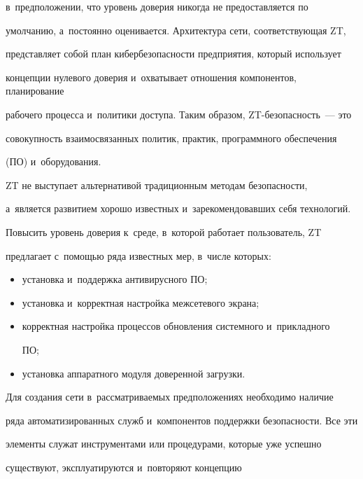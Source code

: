 {в~предположении, что уровень доверия никогда не предоставляется по 


умолчанию, а~постоянно оценивается. Архитектура сети, соответствующая ZT, 


представляет собой план кибербезопасности предприятия, который использует 


концепции нулевого доверия и~охватывает отношения компонентов, планирование 


рабочего процесса и~политики доступа. Таким образом, ZT-безопас\-ность~--- это 


совокупность взаимосвязанных политик, практик, программного обеспечения 


(ПО) и~оборудования.


  


  ZT не выступает альтернативой традиционным методам безопасности, 


а~является развитием хорошо известных и~зарекомендовавших себя технологий. 


Повысить уровень доверия к~среде, в~которой работает пользователь, ZT 


предлагает с~помощью ряда известных мер, в~числе которых: 


  \begin{itemize}


\item установка и~поддержка антивирусного ПО; 


\item установка и~корректная настройка межсетевого экрана; 


\item корректная настройка процессов обновления системного и~прикладного 


ПО;


\item установка аппаратного модуля доверенной загрузки. 


\end{itemize}





  Для создания сети в~рассматриваемых предположениях необходимо наличие 


ряда автоматизированных служб и~компонентов поддержки безопасности. Все эти 


элементы служат инструментами или процедурами, которые уже успешно 


существуют, эксплуатируются и~повторяют концепцию  


}
